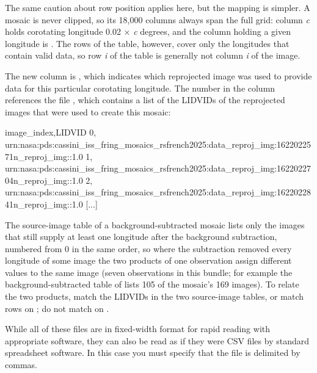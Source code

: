 The same caution about row position applies here, but the mapping is simpler. A mosaic is never clipped, so its 18,000 columns always span the full grid: column \textit{c} holds corotating longitude 0.02 × \textit{c} degrees, and the column holding a given longitude is . The rows of the table, however, cover only the longitudes that contain valid data, so row \textit{i} of the table is generally not column \textit{i} of the image.

The new column is , which indicates which reprojected image was used to provide data for this particular corotating longitude. The number in the  column references the file , which contains a list of the LIDVIDs of the reprojected images that were used to create this mosaic:

\begin{CodeBlock}[fontsize=\scriptsize]
image_index,LIDVID
   0, urn:nasa:pds:cassini_iss_fring_mosaics_rsfrench2025:data_reproj_img:1622022571n_reproj_img::1.0
   1, urn:nasa:pds:cassini_iss_fring_mosaics_rsfrench2025:data_reproj_img:1622022704n_reproj_img::1.0
   2, urn:nasa:pds:cassini_iss_fring_mosaics_rsfrench2025:data_reproj_img:1622022841n_reproj_img::1.0
[...]
\end{CodeBlock}

The source-image table of a background-subtracted mosaic lists only the images that still supply at least one longitude after the background subtraction, numbered from 0 in the same order, so where the subtraction removed every longitude of some image the two products of one observation assign different  values to the same image (seven observations in this bundle; for example the background-subtracted table of  lists 105 of the mosaic’s 169 images). To relate the two products, match the LIDVIDs in the two source-image tables, or match rows on ; do not match on .

While all of these files are in fixed-width format for rapid reading with appropriate software, they can also be read as if they were CSV files by standard spreadsheet software. In this case you must specify that the file is delimited by commas.

